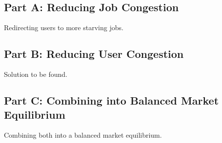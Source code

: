 \subsection{Part A: Reducing Job Congestion}
\label{sec:hybrid_job_congestion}

Redirecting users to more starving jobs.

\subsection{Part B: Reducing User Congestion}
\label{sec:hybrid_user_congestion}

Solution to be found.

\subsection{Part C: Combining into Balanced Market Equilibrium}
\label{sec:hybrid_balance}

Combining both into a balanced market equilibrium.
